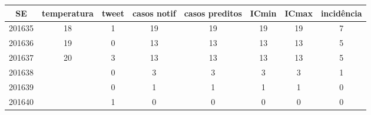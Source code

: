 \begin{tabular}{c|ccccccc}
  \hline
SE & temperatura & tweet & casos notif & casos preditos & ICmin & ICmax & incidência \\ 
  \hline
201635 & 18 & 1 & 19 & 19 & 19 & 19 & 7 \\ 
  201636 & 19 & 0 & 13 & 13 & 13 & 13 & 5 \\ 
  201637 & 20 & 3 & 13 & 13 & 13 & 13 & 5 \\ 
  201638 &  & 0 & 3 & 3 & 3 & 3 & 1 \\ 
  201639 &  & 0 & 1 & 1 & 1 & 1 & 0 \\ 
  201640 &  & 1 & 0 & 0 & 0 & 0 & 0 \\ 
   \hline
\end{tabular}
